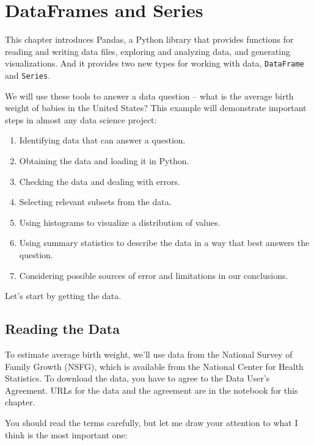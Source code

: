 \hypertarget{dataframes-and-series}{%
\chapter{DataFrames and Series}\label{dataframes-and-series}}

This chapter introduces Pandas, a Python library that provides functions
for reading and writing data files, exploring and analyzing data, and
generating visualizations. And it provides two new types for working
with data, \passthrough{\lstinline!DataFrame!} and
\passthrough{\lstinline!Series!}.

We will use these tools to answer a data question -- what is the average
birth weight of babies in the United States? This example will
demonstrate important steps in almost any data science project:

\begin{enumerate}
\def\labelenumi{\arabic{enumi}.}
\item
  Identifying data that can answer a question.
\item
  Obtaining the data and loading it in Python.
\item
  Checking the data and dealing with errors.
\item
  Selecting relevant subsets from the data.
\item
  Using histograms to visualize a distribution of values.
\item
  Using summary statistics to describe the data in a way that best
  answers the question.
\item
  Considering possible sources of error and limitations in our
  conclusions.
\end{enumerate}

Let's start by getting the data.

\hypertarget{reading-the-data}{%
\section{Reading the Data}\label{reading-the-data}}

To estimate average birth weight, we'll use data from the National
Survey of Family Growth (NSFG), which is available from the National
Center for Health Statistics. To download the data, you have to agree to
the Data User's Agreement. URLs for the data and the agreement are in
the notebook for this chapter.

You should read the terms carefully, but let me draw your attention to
what I think is the most important one:

